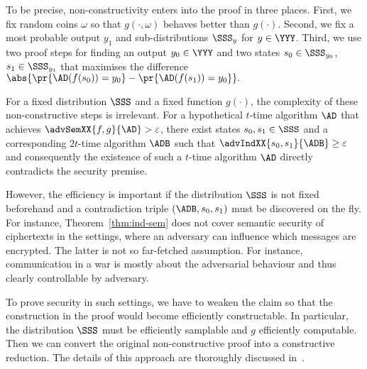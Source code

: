\documentclass{llncs}
\begin{document}
To be precise, non-constructivity enters into the proof in three
places. First, we fix random coins $\omega$ so that $g(\cdot,\omega)$
behaves better than $g(\cdot)$.  Second, we fix a most probable output
$y_1$ and sub-distributions $\SSS_{y}$ for $y\in\YYY$. Third, we use
two proof steps for finding an output $y_0\in\YYY$ and two states
$s_0\in\SSS_{y_0}$, $s_1\in\SSS_{y_1}$ that maximises the difference
$\abs{\pr{\AD(f(s_0))=y_0}-\pr{\AD(f(s_1))=y_0}}.$

For a fixed distribution $\SSS$ and a fixed function $g(\cdot)$, the
complexity of these non-constructive steps is irrelevant. For a
hypothetical $t$-time algorithm $\AD$ that achieves
$\advSemXX{f,g}{\AD}>\varepsilon$, there exist states
$s_0,s_1\in\SSS$ and a corresponding $2t$-time algorithm $\ADB$ such
that $\advIndXX{s_0,s_1}{\ADB}\geq \varepsilon$ and consequently the
existence of such a $t$-time algorithm $\AD$ directly contradicts the
security premise.

However, the efficiency is important if the distribution $\SSS$ is
not fixed beforehand and a contradiction triple $(\ADB, s_0,s_1)$ must
be discovered on the fly. For instance, Theorem~\ref{thm:ind-sem} does
not cover semantic security of ciphertexts in the settings, where an
adversary can influence which messages are encrypted. The latter is
not so far-fetched assumption. For instance, communication in a war is
mostly about the adversarial behaviour and thus clearly controllable
by adversary.

To prove security in such settings, we have to weaken the claim so
that the construction in the proof would become efficiently
constructable. In particular, the distribution $\SSS$ must be
efficiently samplable and $g$ efficiently computable. Then we can
convert the original non-constructive proof into a constructive
reduction. The details of this approach are thoroughly discussed
in~\cite{FOCS1997EXT:Bellare1997}.


\end{document}
